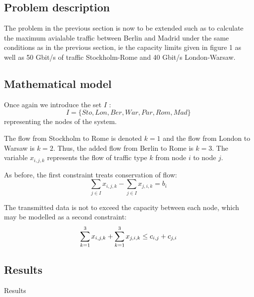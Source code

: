 \subsection{Problem description}

The problem in the previous section is now to be extended such as to calculate the maximum  avialable traffic between Berlin and Madrid under the same conditions as in the previous section, ie the capacity limits given in figure 1 as well as 50 Gbit/s of traffic Stockholm-Rome and 40 Gbit/s London-Warsaw. 

\subsection{Mathematical model}
Once again we introduce the set $I$ :
$$I = \{ Sto,Lon,Ber,War,Par,Rom,Mad\}$$
representing the nodes of the system.

The flow from Stockholm to Rome is denoted $k=1$ and the flow from London to Warsaw is $k=2$. Thus, the added flow from Berlin to Rome is $k=3$. The variable $x_{i,j,k}$ represents the flow of traffic type $k$ from node $i$ to node $j$.

As before, the first constraint treats conservation of flow:
$$\sum\limits_{j \in I} x_{i,j,k} - \sum\limits_{j \in I} x_{j,i,k} = b_{i}$$

The transmitted data is not to exceed the capacity between each node, which may be modelled as a second constraint:
$$\sum\limits_{k =1}^3 x_{i,j,k} + \sum\limits_{k =1}^3 x_{j,i,k} \leq c_{i,j} + c_{j,i}\\$$

\subsection{Results}
Results
